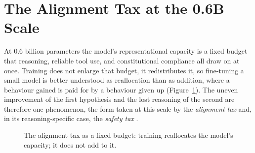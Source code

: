 \section{The Alignment Tax at the 0.6B Scale}
\label{sec:alignment-tax}
\label{sec:capacity-displacement-trade-off}

At 0.6 billion parameters the model's representational capacity is a fixed budget that reasoning, reliable tool use, and constitutional compliance all draw on at once. Training does not enlarge that budget, it redistributes it, so fine-tuning a small model is better understood as reallocation than as addition, where a behaviour gained is paid for by a behaviour given up (Figure~\ref{fig:displacement-concept}). The uneven improvement of the first hypothesis and the lost reasoning of the second are therefore one phenomenon, the form taken at this scale by the \emph{alignment tax} \cite{askell2021generallanguageassistantlaboratory, ouyang2022traininglanguagemodelsfollow} and, in its reasoning-specific case, the \emph{safety tax} \cite{huang2025safetytaxsafetyalignment, fu2026reducingsafetytaxllm}.

\begin{figure}[H]
  \centering
  \caption[The alignment tax as a fixed budget]{The alignment tax as a fixed budget: training reallocates the model's capacity; it does not add to it.}
  \label{fig:displacement-concept}
\end{figure}

